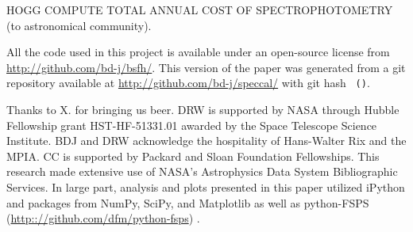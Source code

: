 \documentclass[iop,numberedappendix]{emulateapj}
\begin{document}
HOGG COMPUTE TOTAL ANNUAL COST OF SPECTROPHOTOMETRY (to astronomical community).

All the code used in this project is available under an open-source license
  from \url{http://github.com/bd-j/bsfh/}.
This version of the paper was generated
  from a git repository available at \url{http://github.com/bd-j/speccal/}
  with git hash \texttt{\githash\,(\gitdate)}.

\acknowledgements
Thanks to X. for bringing us beer.
DRW is supported by NASA through Hubble Fellowship grant
  HST-HF-51331.01 awarded by the Space Telescope Science Institute.
BDJ and DRW acknowledge the hospitality of Hans-Walter Rix and the MPIA. 
CC is supported by Packard and Sloan Foundation Fellowships. 
This research made extensive use of NASA's Astrophysics Data System Bibliographic Services. 
In large part, analysis and plots presented in this paper utilized
  iPython and packages from NumPy, SciPy, and Matplotlib
  \citep[][]{hunter2007, oliphant2007, perez2007} as well
  as python-FSPS  (\url{http:://github.com/dfm/python-fsps}) .
\end{document}
